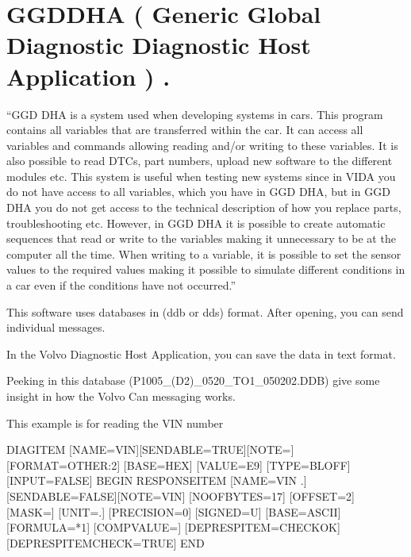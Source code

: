 \documentclass[letterpaper,10pt,english]{sphinxmanual}
\begin{document}
\section{GGD\sphinxhyphen{}DHA ( Generic Global Diagnostic \sphinxhyphen{} Diagnostic Host Application ) .}
\label{\detokenize{software/DHA:ggd-dha-generic-global-diagnostic-diagnostic-host-application}}\label{\detokenize{software/DHA::doc}}
\sphinxAtStartPar
“GGD DHA is a system used when developing systems in cars. This program contains all
variables that are transferred within the car. It can access all variables and commands allowing
reading and/or writing to these variables. It is also possible to read DTCs, part numbers,
upload new software to the different modules etc. This system is useful when testing new
systems since in VIDA you do not have access to all variables, which you have in GGD DHA,
but in GGD DHA you do not get access to the technical description of how you replace parts,
troubleshooting etc. However, in GGD DHA it is possible to create automatic sequences that
read or write to the variables making it unnecessary to be at the computer all the time. When
writing to a variable, it is possible to set the sensor values to the required values making it
possible to simulate different conditions in a car even if the conditions have not occurred.”

\sphinxAtStartPar
{}

\sphinxAtStartPar
This software uses databases in (ddb or dds) format.
After opening, you can send individual messages.

\noindent{}

\sphinxAtStartPar
In the Volvo Diagnostic Host Application, you can save the data in text format.

\sphinxAtStartPar
Peeking in this database (P1005\_(D2)\_0520\_TO1\_050202.DDB) give some insight in how the Volvo Can messaging works.

\sphinxAtStartPar
This example is for reading the VIN number

\begin{sphinxVerbatim}[commandchars=\\\{\}]
DIAG\PYGZus{}ITEM [NAME=VIN][SEND\PYGZus{}ABLE=TRUE][NOTE=] [FORMAT=OTHER:2] [BASE=HEX] [VALUE=E9] [TYPE=BLOFF][INPUT=FALSE]
BEGIN
  RESPONSE\PYGZus{}ITEM [NAME=VIN .][SEND\PYGZus{}ABLE=FALSE][NOTE=VIN] [NO\PYGZus{}OF\PYGZus{}BYTES=17] [OFFSET=2] [MASK=] [UNIT=.] [PRECISION=0] [SIGNED=U] [BASE=ASCII] [FORMULA=*1] [COMP\PYGZus{}VALUE=] [DEP\PYGZus{}RESPITEM=CHECKOK] [DEP\PYGZus{}RESPITEM\PYGZus{}CHECK=TRUE]
END
\end{sphinxVerbatim}
\end{document}
